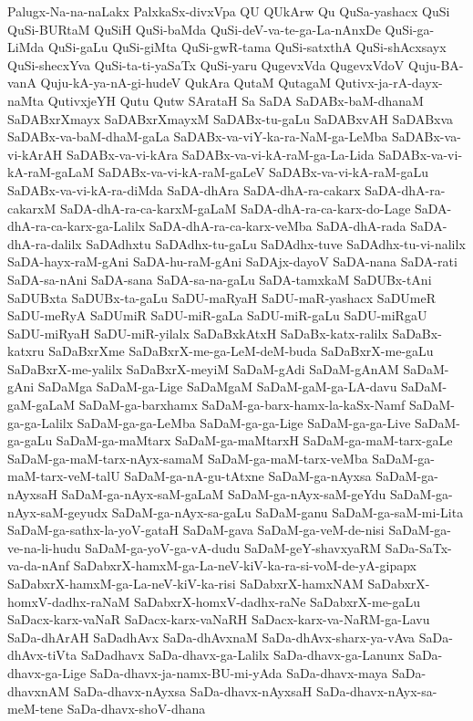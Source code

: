 {Palugx-Na-na-naLakx
PalxkaSx-divxVpa
QU
QUkArw
Qu
QuSa-yashacx
QuSi
QuSi-BURtaM
QuSiH
QuSi-baMda
QuSi-deV-va-te-ga-La-nAnxDe
QuSi-ga-LiMda
QuSi-gaLu
QuSi-giMta
QuSi-gwR-tama
QuSi-satxthA
QuSi-shAcxsayx
QuSi-shecxYva
QuSi-ta-ti-yaSaTx
QuSi-yaru
QugevxVda
QugevxVdoV
Quju-BA-vanA
Quju-kA-ya-nA-gi-hudeV
QukAra
QutaM
QutagaM
Qutivx-ja-rA-dayx-naMta
QutivxjeYH
Qutu
Qutw
SArataH
Sa
SaDA
SaDABx-baM-dhanaM
SaDABxrXmayx
SaDABxrXmayxM
SaDABx-tu-gaLu
SaDABxvAH
SaDABxva
SaDABx-va-baM-dhaM-gaLa
SaDABx-va-viY-ka-ra-NaM-ga-LeMba
SaDABx-va-vi-kArAH
SaDABx-va-vi-kAra
SaDABx-va-vi-kA-raM-ga-La-Lida
SaDABx-va-vi-kA-raM-gaLaM
SaDABx-va-vi-kA-raM-gaLeV
SaDABx-va-vi-kA-raM-gaLu
SaDABx-va-vi-kA-ra-diMda
SaDA-dhAra
SaDA-dhA-ra-cakarx
SaDA-dhA-ra-cakarxM
SaDA-dhA-ra-ca-karxM-gaLaM
SaDA-dhA-ra-ca-karx-do-Lage
SaDA-dhA-ra-ca-karx-ga-Lalilx
SaDA-dhA-ra-ca-karx-veMba
SaDA-dhA-rada
SaDA-dhA-ra-dalilx
SaDAdhxtu
SaDAdhx-tu-gaLu
SaDAdhx-tuve
SaDAdhx-tu-vi-nalilx
SaDA-hayx-raM-gAni
SaDA-hu-raM-gAni
SaDAjx-dayoV
SaDA-nana
SaDA-rati
SaDA-sa-nAni
SaDA-sana
SaDA-sa-na-gaLu
SaDA-tamxkaM
SaDUBx-tAni
SaDUBxta
SaDUBx-ta-gaLu
SaDU-maRyaH
SaDU-maR-yashacx
SaDUmeR
SaDU-meRyA
SaDUmiR
SaDU-miR-gaLa
SaDU-miR-gaLu
SaDU-miRgaU
SaDU-miRyaH
SaDU-miR-yilalx
SaDaBxkAtxH
SaDaBx-katx-ralilx
SaDaBx-katxru
SaDaBxrXme
SaDaBxrX-me-ga-LeM-deM-buda
SaDaBxrX-me-gaLu
SaDaBxrX-me-yalilx
SaDaBxrX-meyiM
SaDaM-gAdi
SaDaM-gAnAM
SaDaM-gAni
SaDaMga
SaDaM-ga-Lige
SaDaMgaM
SaDaM-gaM-ga-LA-davu
SaDaM-gaM-gaLaM
SaDaM-ga-barxhamx
SaDaM-ga-barx-hamx-la-kaSx-Namf
SaDaM-ga-ga-Lalilx
SaDaM-ga-ga-LeMba
SaDaM-ga-ga-Lige
SaDaM-ga-ga-Live
SaDaM-ga-gaLu
SaDaM-ga-maMtarx
SaDaM-ga-maMtarxH
SaDaM-ga-maM-tarx-gaLe
SaDaM-ga-maM-tarx-nAyx-samaM
SaDaM-ga-maM-tarx-veMba
SaDaM-ga-maM-tarx-veM-talU
SaDaM-ga-nA-gu-tAtxne
SaDaM-ga-nAyxsa
SaDaM-ga-nAyxsaH
SaDaM-ga-nAyx-saM-gaLaM
SaDaM-ga-nAyx-saM-geYdu
SaDaM-ga-nAyx-saM-geyudx
SaDaM-ga-nAyx-sa-gaLu
SaDaM-ganu
SaDaM-ga-saM-mi-Lita
SaDaM-ga-sathx-la-yoV-gataH
SaDaM-gava
SaDaM-ga-veM-de-nisi
SaDaM-ga-ve-na-li-hudu
SaDaM-ga-yoV-ga-vA-dudu
SaDaM-geY-shavxyaRM
SaDa-SaTx-va-da-nAnf
SaDabxrX-hamxM-ga-La-neV-kiV-ka-ra-si-voM-de-yA-gipapx
SaDabxrX-hamxM-ga-La-neV-kiV-ka-risi
SaDabxrX-hamxNAM
SaDabxrX-homxV-dadhx-raNaM
SaDabxrX-homxV-dadhx-raNe
SaDabxrX-me-gaLu
SaDacx-karx-vaNaR
SaDacx-karx-vaNaRH
SaDacx-karx-va-NaRM-ga-Lavu
SaDa-dhArAH
SaDadhAvx
SaDa-dhAvxnaM
SaDa-dhAvx-sharx-ya-vAva
SaDa-dhAvx-tiVta
SaDadhavx
SaDa-dhavx-ga-Lalilx
SaDa-dhavx-ga-Lanunx
SaDa-dhavx-ga-Lige
SaDa-dhavx-ja-namx-BU-mi-yAda
SaDa-dhavx-maya
SaDa-dhavxnAM
SaDa-dhavx-nAyxsa
SaDa-dhavx-nAyxsaH
SaDa-dhavx-nAyx-sa-meM-tene
SaDa-dhavx-shoV-dhana
}
